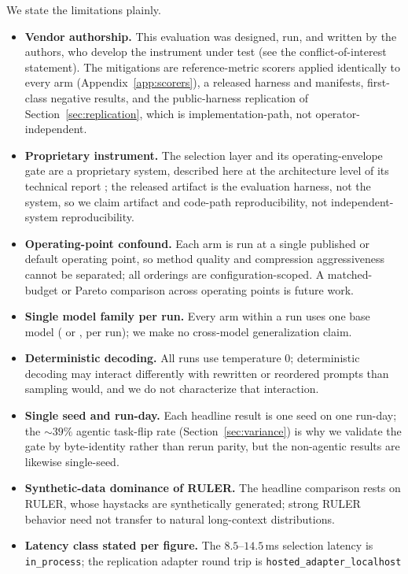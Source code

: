 \documentclass[11pt]{article}
\newcommand{\fn}[1]{{\ttfamily\seqsplit{#1}}}   %
\begin{document}
We state the limitations plainly.
\begin{itemize}
  \item \textbf{Vendor authorship.} This evaluation was designed, run, and written by the authors,
  who develop the instrument under test (see the conflict-of-interest statement). The mitigations are
  reference-metric scorers applied identically to every arm (Appendix~\ref{app:scorers}), a released harness and manifests, first-class negative results, and the
  public-harness replication of Section~\ref{sec:replication}, which is implementation-path, not
  operator-independent.
  \item \textbf{Proprietary instrument.} The selection layer and its operating-envelope gate are a
  proprietary system, described here at the architecture level of its technical report
  \citep{rao2026needlepath}; the released artifact is the
  evaluation harness, not the system, so we claim artifact and code-path reproducibility, not
  independent-system reproducibility.
  \item \textbf{Operating-point confound.} Each arm is run at a single published or default
  operating point, so method quality and compression aggressiveness cannot be separated; all
  orderings are configuration-scoped. A matched-budget or Pareto comparison across operating points
  is future work.
  \item \textbf{Single model family per run.} Every arm within a run uses one base model
  (\fn{gemini-3.1-pro-preview} or \fn{gpt-4o-mini}, per run); we make no cross-model
  generalization claim.
  \item \textbf{Deterministic decoding.} All runs use temperature $0$; deterministic decoding may
  interact differently with rewritten or reordered prompts than sampling would, and we do not
  characterize that interaction.
  \item \textbf{Single seed and run-day.} Each headline result is one seed on one run-day; the
  ${\sim}39\%$ agentic task-flip rate (Section~\ref{sec:variance}) is why we validate the gate by
  byte-identity rather than rerun parity, but the non-agentic results are likewise single-seed.
  \item \textbf{Synthetic-data dominance of RULER.} The headline comparison rests on RULER, whose
  haystacks are synthetically generated; strong RULER behavior need not transfer to natural
  long-context distributions.
  \item \textbf{Latency class stated per figure.} The $8.5$--$14.5$\,ms selection latency is
  \texttt{in\_process}; the replication adapter round trip is \texttt{hosted\_adapter\_localhost}

\end{itemize}
\end{document}
